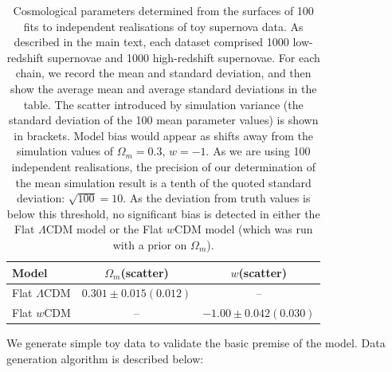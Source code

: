 \documentclass[a4paper,fleqn,usenatbib]{mnras}
\begin{document}
\begin{table}
	\centering
	\caption{Cosmological parameters determined from the surfaces of 100 fits to independent realisations of toy supernova data. As described in the main text, each dataset comprised 1000 low-redshift supernovae and 1000 high-redshift supernovae. For each chain, we record the mean and standard deviation, and then show the average mean and average standard deviations in the table. The scatter introduced by simulation variance (the standard deviation of the 100 mean parameter values) is shown in brackets. Model bias would appear as shifts away from the simulation values of $\Omega_m = 0.3$, $w = -1$. As we are using 100 independent realisations, the precision of our determination of the mean simulation result is a tenth of the quoted standard deviation: $\sqrt{100} = 10$. As the deviation from truth values is below this threshold, no significant bias is detected in either the Flat $\Lambda$CDM model or the Flat $w$CDM model (which was run with a prior on $\Omega_m$).}
	\label{tab:simple_model}
	\begin{tabular}{l|cc}
		\hline
		Model & $\Omega_m$(scatter) & $w$(scatter) \\ 
		\hline
		Flat $\Lambda$CDM & $0.301\pm 0.015(0.012)$ & -- \\ 
		Flat $w$CDM & -- & $-1.00\pm 0.042(0.030)$ \\ 
		\hline
	\end{tabular}
\end{table}

We generate simple toy data to validate the basic premise of the model. Data generation algorithm is described below:
\end{document}
